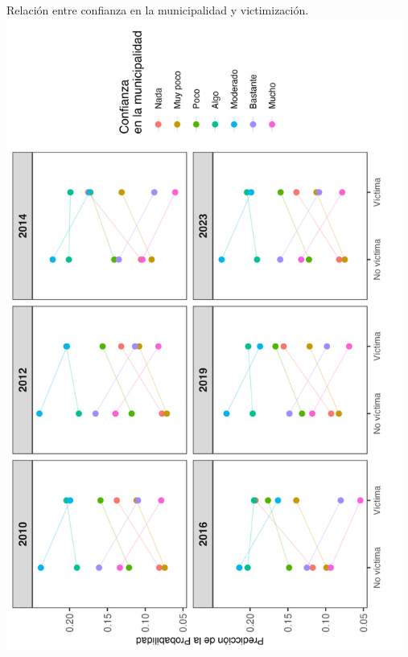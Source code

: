 \documentclass[letterpaper]{article}
\begin{document}
\newpage

\begin{center}
Relación entre confianza en la municipalidad y victimización.
\includegraphics[width = 13cm]{plot_mun_03.png}
    \label{tab:plot4}
\end{center}

\newpage
\end{document}
